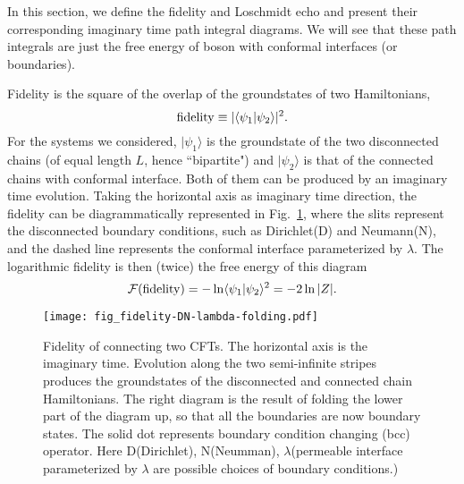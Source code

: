 
In this section, we define the fidelity and Loschmidt echo and present their corresponding imaginary time path integral diagrams.  We will see that these path integrals are just the free energy of boson with conformal interfaces (or boundaries). 

Fidelity is the square of the overlap of the groundstates of two Hamiltonians, 
\begin{equation}
{\rm fidelity} \equiv |\langle \psi_1 |\psi_2  \rangle |^2 .
\end{equation}
For the systems we considered, $|\psi_1 \rangle$ is the groundstate of the two disconnected chains (of equal length $L$, hence ``bipartite") and $|\psi_2\rangle$ is that of the connected chains with conformal interface. Both of them can be produced by an imaginary time evolution. Taking the horizontal axis as imaginary time direction, the fidelity can be diagrammatically represented in Fig.~\ref{fig:fidel}, where the slits represent the disconnected boundary conditions, such as Dirichlet(D) and Neumann(N), and the dashed line represents the conformal interface parameterized by $\lambda$. The logarithmic fidelity is then (twice) the free energy of this diagram
\begin{equation}
\mathcal{F}( {\rm fidelity} )  = - \ln \langle \psi_1 |\psi_2 \rangle^2 = - 2 \ln |Z|.
\end{equation}

\begin{figure}[h]
\texttt{[image: fig\_fidelity-DN-lambda-folding.pdf]}
\caption{Fidelity of connecting two CFTs. The horizontal axis is the imaginary time. Evolution along the two semi-infinite stripes produces the groundstates of the disconnected and connected chain Hamiltonians. The right diagram is the result of folding the lower part of the diagram up, so that all the boundaries are now boundary states. The solid dot represents boundary condition changing (bcc) operator. Here D(Dirichlet), N(Neumman), $\lambda$(permeable interface parameterized by $\lambda$ are possible choices of boundary conditions.)}
\label{fig:fidel}
\end{figure}

